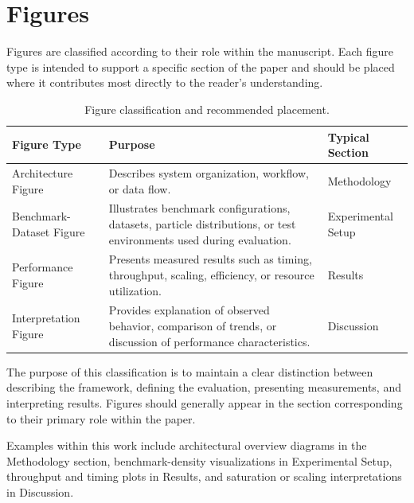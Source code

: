 \section{Figures}

Figures are classified according to their role within the manuscript.
Each figure type is intended to support a specific section of the paper
and should be placed where it contributes most directly to the reader's
understanding.

\begin{table}[h!]
\centering
\caption{Figure classification and recommended placement.}
\label{tab:figure_classification}
\begin{tabular}{p{3.0cm} p{6.5cm} p{3.0cm}}
\hline
\textbf{Figure Type} & \textbf{Purpose} & \textbf{Typical Section} \\
\hline

Architecture Figure &
Describes system organization, workflow, or data flow. &
Methodology \\

Benchmark-Dataset Figure & Illustrates benchmark configurations, datasets, particle distributions,
or test environments used during evaluation. & Experimental Setup \\

Performance Figure &
Presents measured results such as timing, throughput, scaling,
efficiency, or resource utilization. &
Results \\

Interpretation Figure & Provides explanation of observed behavior, comparison of trends, or
discussion of performance characteristics. & Discussion \\

\hline
\end{tabular}
\end{table}

The purpose of this classification is to maintain a clear distinction
between describing the framework, defining the evaluation, presenting
measurements, and interpreting results. Figures should generally appear
in the section corresponding to their primary role within the paper.

Examples within this work include architectural overview diagrams in
the Methodology section, benchmark-density visualizations in
Experimental Setup, throughput and timing plots in Results, and
saturation or scaling interpretations in Discussion.

